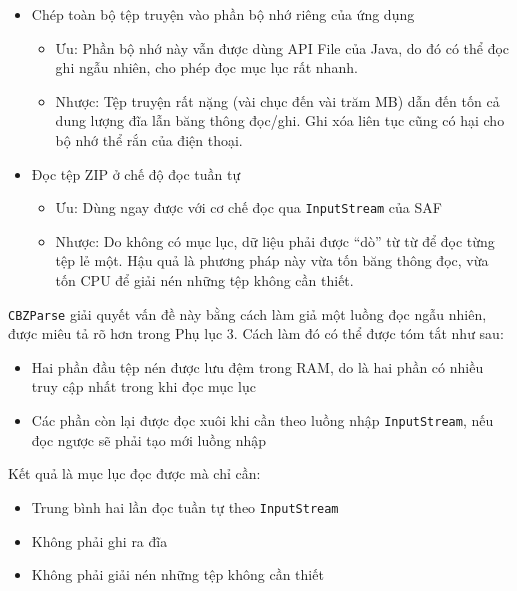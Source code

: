 \documentclass[
]{article}
\providecommand{\tightlist}{%
  \setlength{\itemsep}{0pt}\setlength{\parskip}{0pt}}
\begin{document}
\begin{itemize}
\item
  Chép toàn bộ tệp truyện vào phần bộ nhớ riêng của ứng dụng

  \begin{itemize}
  \item
    Ưu: Phần bộ nhớ này vẫn được dùng API File của Java, do đó có thể
    đọc ghi ngẫu nhiên, cho phép đọc mục lục rất nhanh.
  \item
    Nhược: Tệp truyện rất nặng (vài chục đến vài trăm MB) dẫn đến tốn cả
    dung lượng đĩa lẫn băng thông đọc/ghi. Ghi xóa liên tục cũng có hại
    cho bộ nhớ thể rắn của điện thoại.
  \end{itemize}
\item
  Đọc tệp ZIP ở chế độ đọc tuần tự

  \begin{itemize}
  \tightlist
  \item
    Ưu: Dùng ngay được với cơ chế đọc qua \texttt{InputStream} của SAF
  \item
    Nhược: Do không có mục lục, dữ liệu phải được ``dò'' từ từ để đọc
    từng tệp lẻ một. Hậu quả là phương pháp này vừa tốn băng thông đọc,
    vừa tốn CPU để giải nén những tệp không cần thiết.
  \end{itemize}
\end{itemize}

\texttt{CBZParse} giải quyết vấn đề này bằng cách làm giả một luồng đọc
ngẫu nhiên, được miêu tả rõ hơn trong Phụ lục 3. Cách làm đó có thể được
tóm tắt như sau:

\begin{itemize}
\tightlist
\item
  Hai phần đầu tệp nén được lưu đệm trong RAM, do là hai phần có nhiều
  truy cập nhất trong khi đọc mục lục
\item
  Các phần còn lại được đọc xuôi khi cần theo luồng nhập
  \texttt{InputStream}, nếu đọc ngược sẽ phải tạo mới luồng nhập
\end{itemize}

Kết quả là mục lục đọc được mà chỉ cần:

\begin{itemize}
\tightlist
\item
  Trung bình hai lần đọc tuần tự theo \texttt{InputStream}
\item
  Không phải ghi ra đĩa
\item
  Không phải giải nén những tệp không cần thiết
\end{itemize}
\end{document}
